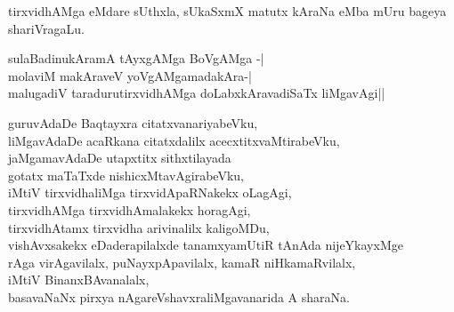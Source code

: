 \begin{entry}
\gl{}
\end{entry}

\begin{entry}
\begin{shl}
tirxvidhAMga eMdare sUthxla, sUkaSxmX matutx kAraNa eMba mUru bageya shariVragaLu.
\end{shl}
\medskip
{}
\gl{}
\begin{shl}
sulaBadinukAramA tAyxgAMga BoVgAMga -|\\
molaviM makAraveV yoVgAMgamadakAra-|\\
malugadiV taradurutirxvidhAMga doLabxkAravadiSaTx liMgavAgi||
\end{shl}
\begin{shl}
guruvAdaDe Baqtayxra citatxvanariyabeVku,\\
liMgavAdaDe acaRkana citatxdalilx acecxtitxvaMtirabeVku,\\
jaMgamavAdaDe utapxtitx sithxtilayada\\
gotatx maTaTxde nishicxMtavAgirabeVku,\\
iMtiV tirxvidhaliMga tirxvidApaRNakekx oLagAgi,\\
tirxvidhAMga tirxvidhAmalakekx horagAgi,\\
tirxvidhAtamx tirxvidha arivinalilx kaligoMDu,\\
vishAvxsakekx eDaderapilalxde tanamxyamUtiR tAnAda nijeYkayxMge\\
rAga virAgavilalx, puNayxpApavilalx, kamaR niHkamaRvilalx,\\
iMtiV BinanxBAvanalalx,\\
basavaNaNx pirxya nAgareVshavxraliMgavanarida A sharaNa.
\end{shl}
\end{entry}

